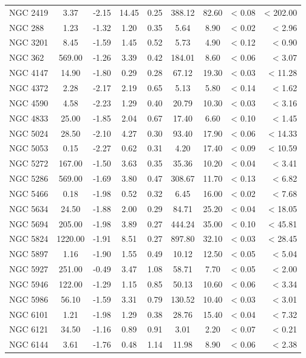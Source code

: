\documentclass[doublespace,nopageskip]{VTthesis}
\begin{document}
\begin{appendices}
\begin{center}
\begin{longtable}{lcccccccr}
NGC 2419 & 3.37 & -2.15 & 14.45 & 0.25 & 388.12 & 82.60 & < 0.08 & < 202.00\\
NGC 288 & 1.23 & -1.32 & 1.20 & 0.35 & 5.64 & 8.90 & < 0.02 & < 2.96\\
NGC 3201 & 8.45 & -1.59 & 1.45 & 0.52 & 5.73 & 4.90 & < 0.12 & < 0.90\\
NGC 362 & 569.00 & -1.26 & 3.39 & 0.42 & 184.01 & 8.60 & < 0.06 & < 3.07\\
NGC 4147 & 14.90 & -1.80 & 0.29 & 0.28 & 67.12 & 19.30 & < 0.03 & < 11.28\\
NGC 4372 & 2.28 & -2.17 & 2.19 & 0.65 & 5.13 & 5.80 & < 0.14 & < 1.62\\
NGC 4590 & 4.58 & -2.23 & 1.29 & 0.40 & 20.79 & 10.30 & < 0.03 & < 3.16\\
NGC 4833 & 25.00 & -1.85 & 2.04 & 0.67 & 17.40 & 6.60 & < 0.10 & < 1.45\\
NGC 5024 & 28.50 & -2.10 & 4.27 & 0.30 & 93.40 & 17.90 & < 0.06 & < 14.33\\
NGC 5053 & 0.15 & -2.27 & 0.62 & 0.31 & 4.20 & 17.40 & < 0.09 & < 10.59\\
NGC 5272 & 167.00 & -1.50 & 3.63 & 0.35 & 35.36 & 10.20 & < 0.04 & < 3.41\\
NGC 5286 & 569.00 & -1.69 & 3.80 & 0.47 & 308.67 & 11.70 & < 0.13 & < 6.82\\
NGC 5466 & 0.18 & -1.98 & 0.52 & 0.32 & 6.45 & 16.00 & < 0.02 & < 7.68\\
NGC 5634 & 24.50 & -1.88 & 2.00 & 0.29 & 84.71 & 25.20 & < 0.04 & < 18.05\\
NGC 5694 & 205.00 & -1.98 & 3.89 & 0.27 & 444.24 & 35.00 & < 0.10 & < 45.81\\
NGC 5824 & 1220.00 & -1.91 & 8.51 & 0.27 & 897.80 & 32.10 & < 0.03 & < 28.45\\
NGC 5897 & 1.16 & -1.90 & 1.55 & 0.49 & 10.12 & 12.50 & < 0.05 & < 5.04\\
NGC 5927 & 251.00 & -0.49 & 3.47 & 1.08 & 58.71 & 7.70 & < 0.05 & < 2.00\\
NGC 5946 & 122.00 & -1.29 & 1.15 & 0.85 & 50.13 & 10.60 & < 0.06 & < 3.34\\
NGC 5986 & 56.10 & -1.59 & 3.31 & 0.79 & 130.52 & 10.40 & < 0.03 & < 3.01\\
NGC 6101 & 1.21 & -1.98 & 1.29 & 0.38 & 28.76 & 15.40 & < 0.04 & < 7.32\\
NGC 6121 & 34.50 & -1.16 & 0.89 & 0.91 & 3.01 & 2.20 & < 0.07 & < 0.21\\
NGC 6144 & 3.61 & -1.76 & 0.48 & 1.14 & 11.98 & 8.90 & < 0.06 & < 2.38\\

\end{longtable}
\end{center}
\end{appendices}
\end{document}
